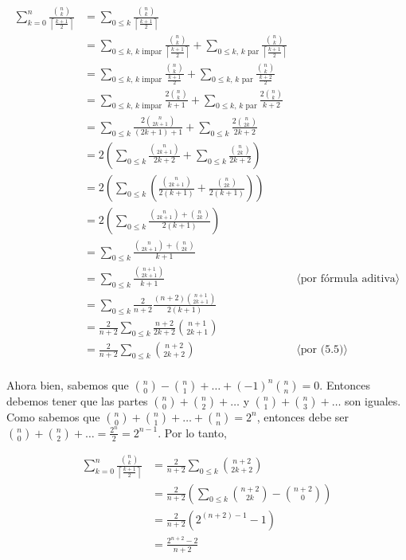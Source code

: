\documentclass{article}
\newcommand{\techo}[1]{\left \lceil #1 \right \rceil}
\begin{document}
\begin{enumerate}[a.]
\begin{align*}
\sum_{k=0}^n \frac{\binom{n}{k}}{\techo{\frac{k+1}{2}}} & = \sum_{0 \leq k} \frac{\binom{n}{k}}{\techo{\frac{k+1}{2}}} \\
  & = \sum_{0 \leq k\text{, } k \text{ impar}} \frac{\binom{n}{k}}{\techo{\frac{k+1}{2}}} +
      \sum_{0 \leq k\text{, } k \text{ par}} \frac{\binom{n}{k}}{\techo{\frac{k+1}{2}}} \\
  & = \sum_{0 \leq k\text{, } k \text{ impar}} \frac{\binom{n}{k}}{\frac{k+1}{2}} +
      \sum_{0 \leq k\text{, } k \text{ par}} \frac{\binom{n}{k}}{\frac{k+2}{2}} \\
  & = \sum_{0 \leq k\text{, } k \text{ impar}} \frac{2 \binom{n}{k}}{k+1} +
      \sum_{0 \leq k\text{, } k \text{ par}} \frac{2 \binom{n}{k}}{k+2} \\
  & = \sum_{0 \leq k} \frac{2 \binom{n}{2k+1}}{(2k+1)+1} +
      \sum_{0 \leq k} \frac{2 \binom{n}{2k}}{2k+2} \\
  & = 2 \left( \sum_{0 \leq k} \frac{\binom{n}{2k+1}}{2k+2} +
      \sum_{0 \leq k} \frac{\binom{n}{2k}}{2k+2} \right) \\
  & = 2 \left( \sum_{0 \leq k} \left( \frac{\binom{n}{2k+1}}{2(k+1)} + \frac{\binom{n}{2k}}{2(k+1)} \right) \right) \\
  & = 2 \left( \sum_{0 \leq k} \frac{\binom{n}{2k+1}+\binom{n}{2k}}{2(k+1)} \right) \\
  & = \sum_{0 \leq k} \frac{\binom{n}{2k+1}+\binom{n}{2k}}{k+1} \\
  & = \sum_{0 \leq k} \frac{\binom{n+1}{2k+1}}{k+1} & \langle \text{por fórmula aditiva} \rangle \\
  & = \sum_{0 \leq k} \frac{2}{n+2} \frac{(n+2) \binom{n+1}{2k+1}}{2(k+1)} \\
  & = \frac{2}{n+2} \sum_{0 \leq k} \frac{n+2}{2k+2} \binom{n+1}{2k+1} \\
  & = \frac{2}{n+2} \sum_{0 \leq k} \binom{n+2}{2k+2} & \langle \text{por (5.5)} \rangle \\
\end{align*}

Ahora bien, sabemos que $\binom{n}{0}-\binom{n}{1}+\ldots+(-1)^n \binom{n}{n} = 0$.
Entonces debemos tener que las partes
$\binom{n}{0}+\binom{n}{2}+\ldots$ y $\binom{n}{1}+\binom{n}{3}+\ldots$ son iguales.
Como sabemos que $\binom{n}{0}+\binom{n}{1}+\ldots+\binom{n}{n} = 2^n$,
entonces debe ser $\binom{n}{0}+\binom{n}{2}+\ldots = \frac{2^n}{2} = 2^{n-1}$.
Por lo tanto,

\begin{align*}
\sum_{k=0}^n \frac{\binom{n}{k}}{\techo{\frac{k+1}{2}}} & = \frac{2}{n+2} \sum_{0 \leq k} \binom{n+2}{2k+2} \\
  & = \frac{2}{n+2} \left( \sum_{0 \leq k} \binom{n+2}{2k} - \binom{n+2}{0} \right) \\
  & = \frac{2}{n+2} \left( 2^{(n+2)-1} - 1 \right) \\
  & = \frac{2^{n+2} - 2}{n+2} \\
\end{align*}

\end{enumerate}
\end{document}
